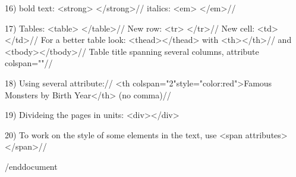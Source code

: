 \documentclass[12pts]{article}
\begin{document}
16) bold text: <strong>      <\slash strong>//
    italics: <em> </em>//

17) Tables: <table> </table>//
    New row: <tr> </tr>//
    New cell: <td> </td>//
    For a better table look: <thead></thead> with <th></th>//
    and <tbody></tbody>//
    Table title spanning several columns, attribute colspan=""//

18) Using several attribute://
<th colspan="2"style="color:red">Famous Monsters by Birth Year</th> (no comma)//

19) Divideing the pages in units: <div></div>

20) To work on the style of some elements in the text, use <span attributes> </span>//



/end{document}
\end{document}
